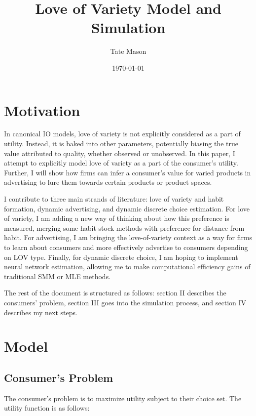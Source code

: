 \documentclass[11pt]{article}
\title{Love of Variety Model and Simulation}
\author{Tate Mason}
\date{\today}
\theoremstyle{definition}
\theoremstyle{remark}
\begin{document}
\maketitle
\thispagestyle{empty}


\newpage
\setcounter{page}{1}

\section{Motivation}

In canonical IO models, love of variety is not explicitly considered as a part of utility. Instead, it is baked into other parameters, potentially biasing the true value attributed to quality, whether observed or unobserved. In this paper, I attempt to explicitly model love of variety as a part of the consumer's utility. Further, I will show how firms can infer a consumer's value for varied products in advertising to lure them towards certain products or product spaces.

I contribute to three main strands of literature: love of variety and habit formation, dynamic advertising, and dynamic discrete choice estimation. For love of variety, I am adding a new way of thinking about how this preference is measured, merging some habit stock methods with preference for distance from habit. For advertising, I am bringing the love-of-variety context as a way for firms to learn about consumers and more effectively advertise to consumers depending on LOV type. Finally, for dynamic discrete choice, I am hoping to implement neural network estimation, allowing me to make computational efficiency gains of traditional SMM or MLE methods.

The rest of the document is structured as follows: section II describes the consumers' problem, section III goes into the simulation process, and section IV describes my next steps.

\section{Model}

\subsection{Consumer's Problem}
The consumer's problem is to maximize utility subject to their choice set. The utility function is as follows:
\end{document}
